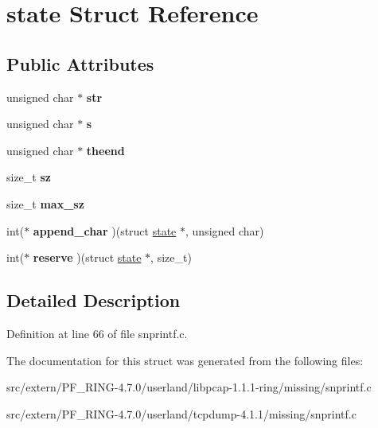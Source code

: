 \hypertarget{structstate}{
\section{state Struct Reference}
\label{structstate}
}
\subsection*{Public Attributes}
\begin{DoxyCompactItemize}
\item 
\hypertarget{structstate_abd3ff81c30819d4794089b346d6cb965}{
unsigned char $\ast$ {\bfseries str}}
\label{structstate_abd3ff81c30819d4794089b346d6cb965}

\item 
\hypertarget{structstate_a0d56a1b41d3ba6badad7df14ce579f39}{
unsigned char $\ast$ {\bfseries s}}
\label{structstate_a0d56a1b41d3ba6badad7df14ce579f39}

\item 
\hypertarget{structstate_ad90d5465fa2d079a77cae06d3f57a1e0}{
unsigned char $\ast$ {\bfseries theend}}
\label{structstate_ad90d5465fa2d079a77cae06d3f57a1e0}

\item 
\hypertarget{structstate_ab3a98a57d55b458be21b4efff1fc65bc}{
size\_\-t {\bfseries sz}}
\label{structstate_ab3a98a57d55b458be21b4efff1fc65bc}

\item 
\hypertarget{structstate_a853ba9f9495324903a9e9c27630c014c}{
size\_\-t {\bfseries max\_\-sz}}
\label{structstate_a853ba9f9495324903a9e9c27630c014c}

\item 
\hypertarget{structstate_a66e5911215c66e12185796007339aba9}{
int($\ast$ {\bfseries append\_\-char} )(struct \hyperlink{structstate}{state} $\ast$, unsigned char)}
\label{structstate_a66e5911215c66e12185796007339aba9}

\item 
\hypertarget{structstate_aefdb1aee2565c25e919a11e9e0223754}{
int($\ast$ {\bfseries reserve} )(struct \hyperlink{structstate}{state} $\ast$, size\_\-t)}
\label{structstate_aefdb1aee2565c25e919a11e9e0223754}

\end{DoxyCompactItemize}


\subsection{Detailed Description}


Definition at line 66 of file snprintf.c.



The documentation for this struct was generated from the following files:\begin{DoxyCompactItemize}
\item 
src/extern/PF\_\-RING-\/4.7.0/userland/libpcap-\/1.1.1-\/ring/missing/snprintf.c\item 
src/extern/PF\_\-RING-\/4.7.0/userland/tcpdump-\/4.1.1/missing/snprintf.c\end{DoxyCompactItemize}

